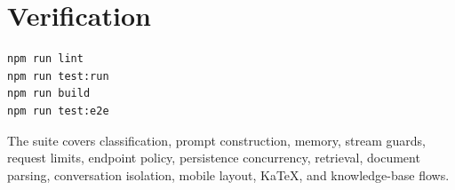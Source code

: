 \documentclass[a4paper,11pt]{article}
\begin{document}
\section{Verification}

\begin{lstlisting}
npm run lint
npm run test:run
npm run build
npm run test:e2e
\end{lstlisting}

The suite covers classification, prompt construction, memory, stream guards, request limits, endpoint policy, persistence concurrency, retrieval, document parsing, conversation isolation, mobile layout, KaTeX, and knowledge-base flows.
\end{document}
